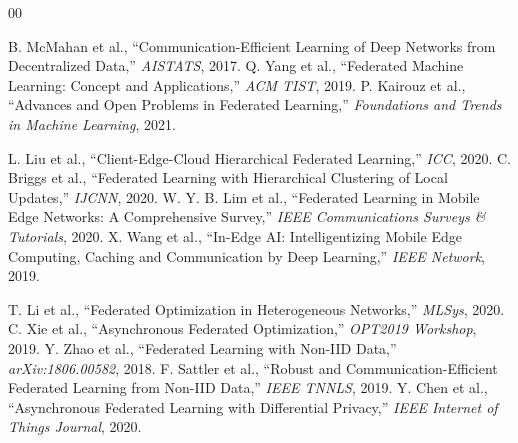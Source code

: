 \documentclass[conference]{IEEEtran}
\begin{document}
\begin{thebibliography}{00}

 B. McMahan et al., ``Communication-Efficient Learning of Deep Networks from Decentralized Data,'' \textit{AISTATS}, 2017.
 Q. Yang et al., ``Federated Machine Learning: Concept and Applications,'' \textit{ACM TIST}, 2019.
 P. Kairouz et al., ``Advances and Open Problems in Federated Learning,'' \textit{Foundations and Trends in Machine Learning}, 2021.

 L. Liu et al., ``Client-Edge-Cloud Hierarchical Federated Learning,'' \textit{ICC}, 2020.
 C. Briggs et al., ``Federated Learning with Hierarchical Clustering of Local Updates,'' \textit{IJCNN}, 2020.
 W. Y. B. Lim et al., ``Federated Learning in Mobile Edge Networks: A Comprehensive Survey,'' \textit{IEEE Communications Surveys \& Tutorials}, 2020.
 X. Wang et al., ``In-Edge AI: Intelligentizing Mobile Edge Computing, Caching and Communication by Deep Learning,'' \textit{IEEE Network}, 2019.

 T. Li et al., ``Federated Optimization in Heterogeneous Networks,'' \textit{MLSys}, 2020.
 C. Xie et al., ``Asynchronous Federated Optimization,'' \textit{OPT2019 Workshop}, 2019.
 Y. Zhao et al., ``Federated Learning with Non-IID Data,'' \textit{arXiv:1806.00582}, 2018.
 F. Sattler et al., ``Robust and Communication-Efficient Federated Learning from Non-IID Data,'' \textit{IEEE TNNLS}, 2019.
 Y. Chen et al., ``Asynchronous Federated Learning with Differential Privacy,'' \textit{IEEE Internet of Things Journal}, 2020.


\end{thebibliography}
\end{document}
